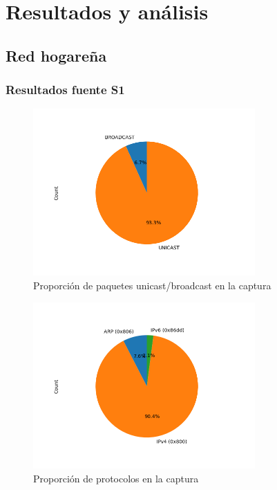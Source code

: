 \section{Resultados y análisis}

\subsection*{Red hogareña}
\subsubsection*{Resultados fuente S1}
\begin{figure}[H]
  \centering
  \includegraphics[width=8.5cm]{figs/broadcast_proportion_hogar_ethernet_S1_output.png}
  \caption{\normalfont Proporción de paquetes unicast/broadcast en la captura}
\end{figure}

\begin{figure}[H]
  \centering
  \includegraphics[width=8.5cm]{figs/protocols_proportion_hogar_ethernet_S1_output.png}
  \caption{\normalfont Proporción de protocolos en la captura}
\end{figure}

